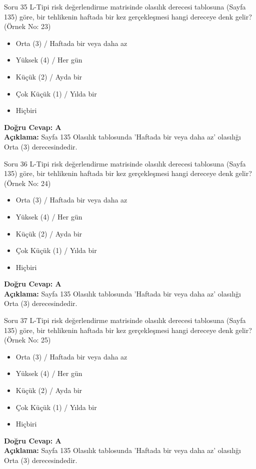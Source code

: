 \documentclass[12pt,a4paper]{article}
\begin{document}
\begin{testcard}{Soru 35}
    L-Tipi risk değerlendirme matrisinde olasılık derecesi tablosuna (Sayfa 135) göre, bir tehlikenin haftada bir kez gerçekleşmesi hangi dereceye denk gelir? (Örnek No: 23)
    \begin{itemize}
        \item[A)] Orta (3) / Haftada bir veya daha az
        \item[B)] Yüksek (4) / Her gün
        \item[C)] Küçük (2) / Ayda bir
        \item[D)] Çok Küçük (1) / Yılda bir
        \item[E)] Hiçbiri
    \end{itemize}
    \tcblower
    \textbf{Doğru Cevap: A} \\
    \textbf{Açıklama:} Sayfa 135 Olasılık tablosunda 'Haftada bir veya daha az' olasılığı Orta (3) derecesindedir.
\end{testcard}

\begin{testcard}{Soru 36}
    L-Tipi risk değerlendirme matrisinde olasılık derecesi tablosuna (Sayfa 135) göre, bir tehlikenin haftada bir kez gerçekleşmesi hangi dereceye denk gelir? (Örnek No: 24)
    \begin{itemize}
        \item[A)] Orta (3) / Haftada bir veya daha az
        \item[B)] Yüksek (4) / Her gün
        \item[C)] Küçük (2) / Ayda bir
        \item[D)] Çok Küçük (1) / Yılda bir
        \item[E)] Hiçbiri
    \end{itemize}
    \tcblower
    \textbf{Doğru Cevap: A} \\
    \textbf{Açıklama:} Sayfa 135 Olasılık tablosunda 'Haftada bir veya daha az' olasılığı Orta (3) derecesindedir.
\end{testcard}

\begin{testcard}{Soru 37}
    L-Tipi risk değerlendirme matrisinde olasılık derecesi tablosuna (Sayfa 135) göre, bir tehlikenin haftada bir kez gerçekleşmesi hangi dereceye denk gelir? (Örnek No: 25)
    \begin{itemize}
        \item[A)] Orta (3) / Haftada bir veya daha az
        \item[B)] Yüksek (4) / Her gün
        \item[C)] Küçük (2) / Ayda bir
        \item[D)] Çok Küçük (1) / Yılda bir
        \item[E)] Hiçbiri
    \end{itemize}
    \tcblower
    \textbf{Doğru Cevap: A} \\
    \textbf{Açıklama:} Sayfa 135 Olasılık tablosunda 'Haftada bir veya daha az' olasılığı Orta (3) derecesindedir.
\end{testcard}
\end{document}
